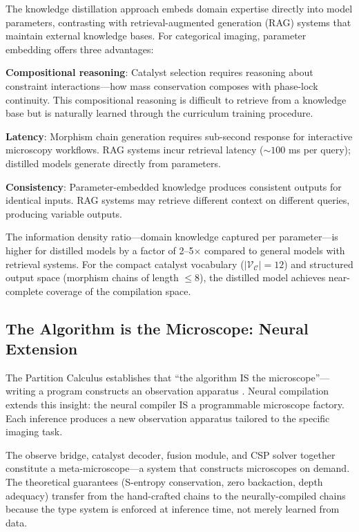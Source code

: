 \documentclass[11pt,a4paper]{article}
\theoremstyle{definition}
\theoremstyle{remark}
\newcommand{\catalyst}{\mathcal{C}}
\newcommand{\vocab}{\mathcal{V}}
\begin{document}
The knowledge distillation approach embeds domain expertise directly into model parameters, contrasting with retrieval-augmented generation (RAG) systems that maintain external knowledge bases. For categorical imaging, parameter embedding offers three advantages:

\textbf{Compositional reasoning}: Catalyst selection requires reasoning about constraint interactions---how mass conservation composes with phase-lock continuity. This compositional reasoning is difficult to retrieve from a knowledge base but is naturally learned through the curriculum training procedure.

\textbf{Latency}: Morphism chain generation requires sub-second response for interactive microscopy workflows. RAG systems incur retrieval latency ($\sim 100$ ms per query); distilled models generate directly from parameters.

\textbf{Consistency}: Parameter-embedded knowledge produces consistent outputs for identical inputs. RAG systems may retrieve different context on different queries, producing variable outputs.

The information density ratio---domain knowledge captured per parameter---is higher for distilled models by a factor of 2--5$\times$ compared to general models with retrieval systems. For the compact catalyst vocabulary ($|\vocab_\catalyst| = 12$) and structured output space (morphism chains of length $\leq 8$), the distilled model achieves near-complete coverage of the compilation space.

\subsection{The Algorithm is the Microscope: Neural Extension}

The Partition Calculus establishes that ``the algorithm IS the microscope''---writing a program constructs an observation apparatus \cite{partition2024}. Neural compilation extends this insight: the neural compiler IS a programmable microscope factory. Each inference produces a new observation apparatus tailored to the specific imaging task.

The observe bridge, catalyst decoder, fusion module, and CSP solver together constitute a meta-microscope---a system that constructs microscopes on demand. The theoretical guarantees (S-entropy conservation, zero backaction, depth adequacy) transfer from the hand-crafted chains to the neurally-compiled chains because the type system is enforced at inference time, not merely learned from data.
\end{document}
